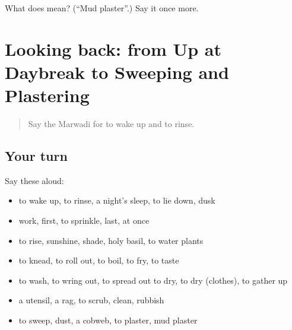 \begin{tcolorbox}[breakable,colback=teal!4,colframe=teal!35!black,title={Before you move on}]
What does  mean? (\textquotedblleft{}Mud plaster\textquotedblright{}.) Say it once more.
\end{tcolorbox}
\section[(dialogue)]{Looking back: from Up at Daybreak to Sweeping and Plastering}

\label{lesson:MW-R172-review-166-172}



\begin{quote}
Say the Marwadi for to wake up and to rinse.
\end{quote}

\subsection*{Your turn}
Say these aloud:

\begin{itemize}
\raggedright
  \item to wake up, to rinse, a night's sleep, to lie down, dusk
  \item work, first, to sprinkle, last, at once
  \item to rise, sunshine, shade, holy basil, to water plants
  \item to knead, to roll out, to boil, to fry, to taste
  \item to wash, to wring out, to spread out to dry, to dry (clothes), to gather up
  \item a utensil, a rag, to scrub, clean, rubbish
  \item to sweep, dust, a cobweb, to plaster, mud plaster
\end{itemize}

